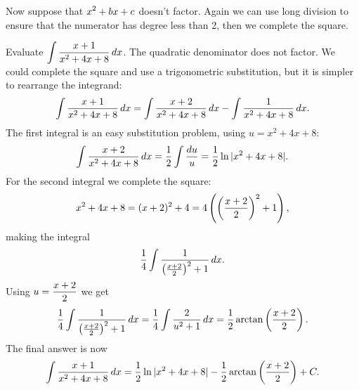 Now suppose that $\displaystyle x^2+bx+c$ doesn't factor. Again we can use long
division to ensure that the numerator has degree less than 2, then we
complete the square.

\example 
Evaluate $\displaystyle\int {x+1\over x^2+4x+8}\,dx$. The quadratic denominator
does not factor. We could complete the square and use a trigonometric
substitution, but it is simpler to rearrange the integrand:
$$
  \int {x+1\over x^2+4x+8}\,dx = \int {x+2\over x^2+4x+8}\,dx -
  \int {1\over x^2+4x+8}\,dx.
$$
The first integral is an easy substitution problem, using $u=x^2+4x+8$:
$$
  \int {x+2\over x^2+4x+8}\,dx={1\over2}\int {du\over u}=
  {1\over2}\ln|x^2+4x+8|.
$$
For the second integral we complete the square:
$$
  x^2+4x+8=(x+2)^2+4=4\left(\left({x+2\over2}\right)^2+1\right),
$$
making the integral
$$ 
  {1\over4}\int {1\over\left({x+2\over2}\right)^2+1}\,dx.
$$
Using $\displaystyle u={x+2\over2}$ we get
$$
  {1\over4}\int {1\over\left({x+2\over2}\right)^2+1}\,dx=
  {1\over4}\int {2\over u^2+1}\,dx=
  {1\over2}\arctan\left({x+2\over2}\right).
$$
The final answer is now 
$$
  \int {x+1\over x^2+4x+8}\,dx={1\over2}\ln|x^2+4x+8|-
  {1\over2}\arctan\left({x+2\over2}\right)+C.
$$
\endexample


